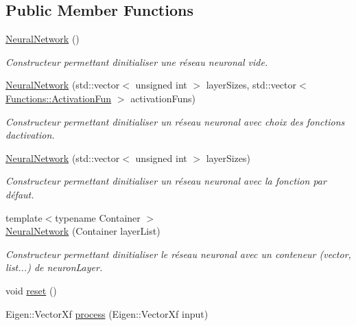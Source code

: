 \subsection*{Public Member Functions}
\begin{DoxyCompactItemize}
\item 
\hyperlink{classNeuralNetwork_accce4a7728e89a009a9d4ca1758c9b9d}{Neural\+Network} ()
\begin{DoxyCompactList}\small\item\em Constructeur permettant d\textquotesingle{}initialiser une réseau neuronal vide. \end{DoxyCompactList}\item 
\hyperlink{classNeuralNetwork_a85cd20f411e96dfd28954fcda39badb7}{Neural\+Network} (std\+::vector$<$ unsigned int $>$ layer\+Sizes, std\+::vector$<$ \hyperlink{structFunctions_ad25362ffa52b2f7933431190546593ac}{Functions\+::\+Activation\+Fun} $>$ activation\+Funs)
\begin{DoxyCompactList}\small\item\em Constructeur permettant d\textquotesingle{}initialiser un réseau neuronal avec choix des fonctions d\textquotesingle{}activation. \end{DoxyCompactList}\item 
\hyperlink{classNeuralNetwork_ab4015471a72a3d00b6bcabf156526f7b}{Neural\+Network} (std\+::vector$<$ unsigned int $>$ layer\+Sizes)
\begin{DoxyCompactList}\small\item\em Constructeur permettant d\textquotesingle{}initialiser un réseau neuronal avec la fonction par défaut. \end{DoxyCompactList}\item 
{\footnotesize template$<$typename Container $>$ }\\\hyperlink{classNeuralNetwork_a7943bb4e9cb96aae048b236d4f1dd979}{Neural\+Network} (Container layer\+List)
\begin{DoxyCompactList}\small\item\em Constructeur permettant d\textquotesingle{}initialiser le réseau neuronal avec un conteneur (vector, list...) de neuron\+Layer. \end{DoxyCompactList}\item 
void \hyperlink{classNeuralNetwork_a3e41ea08d6d8d80ba178322d1e0f1091}{reset} ()
\item 
Eigen\+::\+Vector\+Xf \hyperlink{classNeuralNetwork_a98cab3b3726fbf06dca316068c29c783}{process} (Eigen\+::\+Vector\+Xf input)
\end{DoxyCompactItemize}
